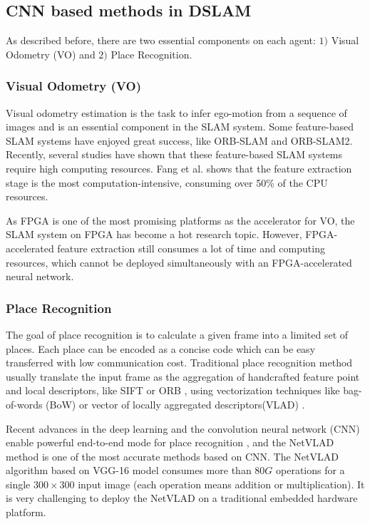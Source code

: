 \label{sec:background}
\subsection{CNN based methods in DSLAM}
As described before, there are two essential components on each agent: $1)$ Visual Odometry (VO) and $2)$ Place Recognition.

\subsubsection{Visual Odometry (VO)}

Visual odometry estimation is the task to infer ego-motion from a sequence of images and is an essential component in the SLAM system. Some feature-based SLAM systems have enjoyed great success, like ORB-SLAM\cite{DBLP:journals/trob/Mur-ArtalMT15} and ORB-SLAM2\cite{Mur-Artal:2017281}. Recently, several studies have shown that these feature-based SLAM systems require high computing resources. Fang et al.\cite{Fang2017FPGAbasedOF} shows that the feature extraction stage is the most computation-intensive, consuming over 50\% of the CPU resources.

As FPGA is one of the most promising platforms as the accelerator for VO, the SLAM system on FPGA has become a hot research topic. However, FPGA-accelerated feature extraction still consumes a lot of time and computing resources, which cannot be deployed simultaneously with an FPGA-accelerated neural network.

\subsubsection{Place Recognition}

The goal of place recognition is to calculate a given frame into a limited set of places. Each place can be encoded as a concise code which can be easy transferred with low communication cost. Traditional place recognition method usually translate the input frame as the aggregation of handcrafted feature point and local descriptors, like SIFT \cite{Lowe:2004e6e} or ORB \cite{Mur-Artal:2017281}, using vectorization techniques like bag-of-words (BoW) \cite{Galvez-Lopez:2012c94} or vector of locally aggregated descriptors(VLAD) \cite{Jegou:2010f45}.

Recent advances in the deep learning and the convolution neural network (CNN) enable powerful end-to-end mode for place recognition \cite{Noh:2017d0b, Arandjelovic:2017997}, and the NetVLAD method is one of the most accurate methods based on CNN. The NetVLAD algorithm based on VGG-16 model \cite{Simonyan:20143be} consumes more than $80G$ operations for a single $300 \times 300$ input image (each operation means addition or  multiplication). It is very challenging to deploy the NetVLAD on a traditional embedded hardware platform.

